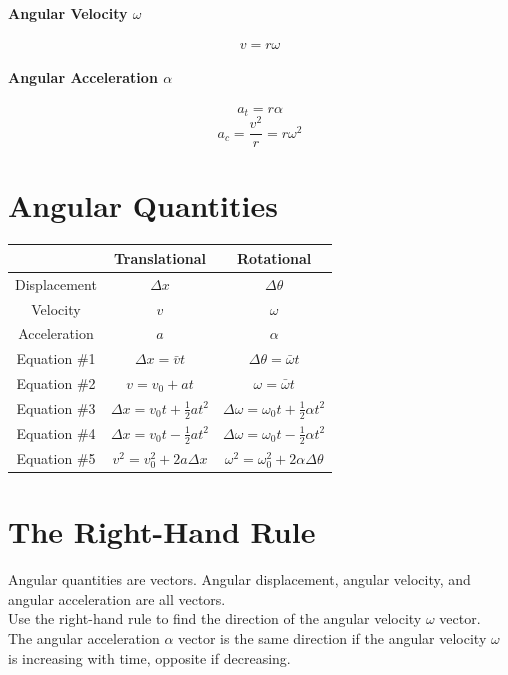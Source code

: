 \documentclass[11pt,letter]{report}
\begin{document}
\paragraph{Angular Velocity $\omega$}
$$v = r\omega$$

\paragraph{Angular Acceleration $\alpha$}
$$a_t = r\alpha$$
$$a_c = \frac{v^2}{r} = r\omega^2$$

\section{Angular Quantities}
\begin{center}
{\tabulinesep=1.2mm
\begin{tabu}{c | c | c}
& Translational & Rotational\\ \hline
Displacement & $\displaystyle \Delta x$ & $\displaystyle \Delta \theta$\\
Velocity & $\displaystyle v$ & $\displaystyle \omega$\\
Acceleration & $\displaystyle a$ & $\displaystyle \alpha$\\
Equation \#1 & $\displaystyle \Delta x = \bar{v}t$ & $\displaystyle \Delta \theta = \bar{\omega}t$\\
Equation \#2 & $\displaystyle v = v_0 + at$ & $\displaystyle \omega = \bar{\omega}t$\\
Equation \#3 & $\displaystyle \Delta x = v_0t + \frac{1}{2}at^2$ & $\displaystyle \Delta \omega = \omega_0t + \frac{1}{2}\alpha t^2$\\
Equation \#4 & $\displaystyle \Delta x = v_0t - \frac{1}{2}at^2$ & $\displaystyle \Delta \omega = \omega_0t - \frac{1}{2}\alpha t^2$\\
Equation \#5 & $\displaystyle v^2 = v_0^2 + 2a\Delta x$ & $\displaystyle \omega^2 = \omega_0^2 + 2\alpha\Delta\theta$\\
\end{tabu}}
\end{center}

\section{The Right-Hand Rule}
Angular quantities are vectors. Angular displacement, angular velocity, and angular acceleration are all vectors.\\
Use the right-hand rule to find the direction of the angular velocity $\omega$ vector.\\
The angular acceleration $\alpha$ vector is the same direction if the angular velocity $\omega$ is increasing with time, opposite if decreasing.
\end{document}

